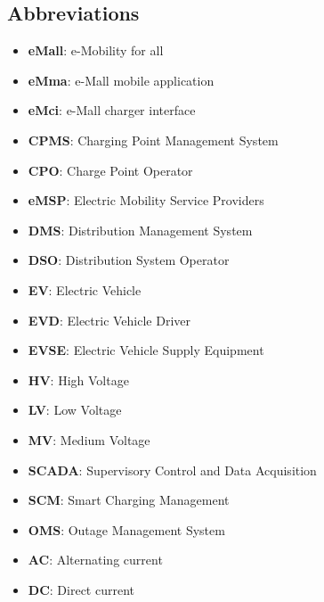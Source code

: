 \subsection{Abbreviations}
\begin{itemize}
    \item \textbf{eMall}: e-Mobility for all
    \item \textbf{eMma}: e-Mall mobile application
    \item \textbf{eMci}: e-Mall charger interface
    \item \textbf{CPMS}: Charging Point Management System
    \item \textbf{CPO}: Charge Point Operator
    \item \textbf{eMSP}: Electric Mobility Service Providers
    \item \textbf{DMS}: Distribution Management System
    \item \textbf{DSO}: Distribution System Operator
    \item \textbf{EV}: Electric Vehicle
    \item \textbf{EVD}: Electric Vehicle Driver
    \item \textbf{EVSE}: Electric Vehicle Supply Equipment
    \item \textbf{HV}: High Voltage
    \item \textbf{LV}: Low Voltage
    \item \textbf{MV}: Medium Voltage
    \item \textbf{SCADA}: Supervisory Control and Data Acquisition
    \item \textbf{SCM}: Smart Charging Management 
    \item \textbf{OMS}: Outage Management System
    \item \textbf{AC}: Alternating current
    \item \textbf{DC}: Direct current
\end{itemize}

